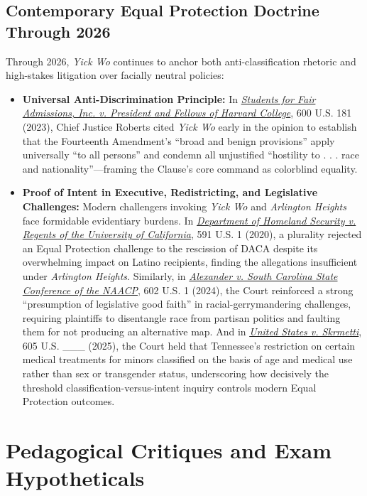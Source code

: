 \documentclass[12pt]{article}
\begin{document}
\subsection{Contemporary Equal Protection Doctrine Through 2026}
Through 2026, \emph{Yick Wo} continues to anchor both anti-classification rhetoric and high-stakes litigation over facially neutral policies:
\begin{itemize}
    \item \textbf{Universal Anti-Discrimination Principle:} In \href{https://supreme.justia.com/cases/federal/us/600/20-1199/}{\emph{Students for Fair Admissions, Inc. v. President and Fellows of Harvard College}}, 600 U.S. 181 (2023), Chief Justice Roberts cited \emph{Yick Wo} early in the opinion to establish that the Fourteenth Amendment's ``broad and benign provisions'' apply universally ``to all persons'' and condemn all unjustified ``hostility to . . . race and nationality''---framing the Clause's core command as colorblind equality.
    \item \textbf{Proof of Intent in Executive, Redistricting, and Legislative Challenges:} Modern challengers invoking \emph{Yick Wo} and \emph{Arlington Heights} face formidable evidentiary burdens. In \href{https://supreme.justia.com/cases/federal/us/591/18-587/}{\emph{Department of Homeland Security v. Regents of the University of California}}, 591 U.S. 1 (2020), a plurality rejected an Equal Protection challenge to the rescission of DACA despite its overwhelming impact on Latino recipients, finding the allegations insufficient under \emph{Arlington Heights}. Similarly, in \href{https://supreme.justia.com/cases/federal/us/602/22-807/}{\emph{Alexander v. South Carolina State Conference of the NAACP}}, 602 U.S. 1 (2024), the Court reinforced a strong ``presumption of legislative good faith'' in racial-gerrymandering challenges, requiring plaintiffs to disentangle race from partisan politics and faulting them for not producing an alternative map. And in \href{https://supreme.justia.com/cases/federal/us/605/23-477/}{\emph{United States v. Skrmetti}}, 605 U.S. \_\_\_ (2025), the Court held that Tennessee's restriction on certain medical treatments for minors classified on the basis of age and medical use rather than sex or transgender status, underscoring how decisively the threshold classification-versus-intent inquiry controls modern Equal Protection outcomes.
\end{itemize}

\section{Pedagogical Critiques and Exam Hypotheticals}
\end{document}
